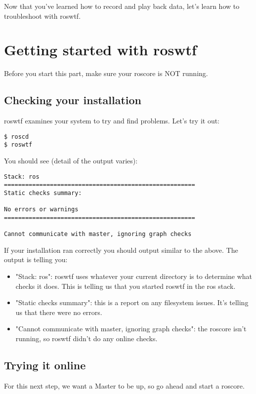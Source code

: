 Now that you've learned how to record and play back data, let's learn how to troubleshoot with roswtf.

\section{Getting started with roswtf}

Before you start this part, make sure your roscore is NOT running.

\subsection{Checking your installation}

roswtf examines your system to try and find problems. Let's try it out:

\begin{lstlisting}[breaklines=true languages=bash]
$ roscd
$ roswtf
\end{lstlisting}

You should see (detail of the output varies):

\begin{lstlisting}[breaklines=true languages=bash]
Stack: ros
======================================================
Static checks summary:

No errors or warnings
======================================================

Cannot communicate with master, ignoring graph checks
\end{lstlisting}

If your installation ran correctly you should output similar to the above. The output is telling you:

\begin{itemize}
	\item "Stack: ros": roswtf uses whatever your current directory is to determine what checks it does. This is telling us that you started roswtf in the ros stack.
	\item "Static checks summary": this is a report on any filesystem issues. It's telling us that there were no errors.
	\item "Cannot communicate with master, ignoring graph checks": the roscore isn't running, so roswtf didn't do any online checks.
\end{itemize}

\subsection{Trying it online}
For this next step, we want a Master to be up, so go ahead and start a roscore.

